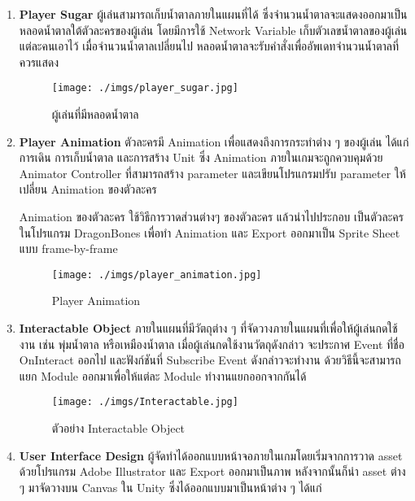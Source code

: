 \documentclass[12pt,oneside,openright,a4paper]{cpe-thai-project}
\begin{document}
\begin{enumerate}
  \item \textbf{Player Sugar}
    ผู้เล่นสามารถเก็บน้ำตาลภายในแผนที่ได้ ซึ่งจำนวนน้ำตาลจะแสดงออกมาเป็นหลอดน้ำตาลใต้ตัวละครของผู้เล่น 
    โดยมีการใช้  Network Variable เก็บตัวเลขน้ำตาลของผู้เล่นแต่ละคนเอาไว้ เมื่อจำนวนน้ำตาลเปลี่ยนไป 
    หลอดน้ำตาลจะรับคำสั่งเพื่ออัพเดทจำนวนน้ำตาลที่ควรแสดง 

    \begin{figure}[H]\centering
      \texttt{[image: ./imgs/player\_sugar.jpg]}
      \caption{ผู้เล่นที่มีหลอดน้ำตาล}\label{fig:4-4}
    \end{figure}

  \item \textbf{Player Animation}
    ตัวละครมี Animation เพื่อแสดงถึงการกระทำต่าง ๆ ของผู้เล่น 
    ได้แก่ การเดิน การเก็บน้ำตาล และการสร้าง Unit ซึ่ง Animation 
    ภายในเกมจะถูกควบคุมด้วย Animator Controller ที่สามารถสร้าง parameter 
    และเขียนโปรแกรมปรับ parameter ให้เปลี่ยน Animation ของตัวละคร 

    Animation ของตัวละคร ใช้วิธีการวาดส่วนต่างๆ ของตัวละคร แล้วนำไปประกอบ
    เป็นตัวละครในโปรแกรม DragonBones เพื่อทำ Animation และ Export 
    ออกมาเป็น Sprite Sheet แบบ frame-by-frame

    \begin{figure}[H]\centering
      \texttt{[image: ./imgs/player\_animation.jpg]}
      \caption{Player Animation}\label{fig:4-5}
    \end{figure}
    
  \item \textbf{Interactable Object}
    ภายในแผนที่มีวัตถุต่าง ๆ ที่จัดวางภายในแผนที่เพื่อให้ผู้เล่นกดใช้งาน 
    เช่น พุ่มน้ำตาล หรือเหมืองน้ำตาล เมื่อผู้เล่นกดใช้งานวัตถุดังกล่าว 
    จะประกาศ Event ที่ชื่อ OnInteract ออกไป และฟังก์ชันที่ Subscribe Event 
    ดังกล่าวจะทำงาน ด้วยวิธีนี้จะสามารถแยก Module ออกมาเพื่อให้แต่ละ Module ทำงานแยกออกจากกันได้

    \begin{figure}[H]\centering
      \texttt{[image: ./imgs/Interactable.jpg]}
      \caption{ตัวอย่าง Interactable Object}\label{fig:4-6}
    \end{figure}
    
  \item \textbf{User Interface Design}
    ผู้จัดทำได้ออกแบบหน้าจอภายในเกมโดยเริ่มจากการวาด asset 
    ด้วยโปรแกรม Adobe Illustrator และ Export ออกมาเป็นภาพ 
    หลังจากนั้นก็นำ asset ต่าง ๆ มาจัดวางบน Canvas ใน Unity 
    ซึ่งได้ออกแบบมาเป็นหน้าต่าง ๆ ได้แก่


\end{enumerate}
\end{document}
